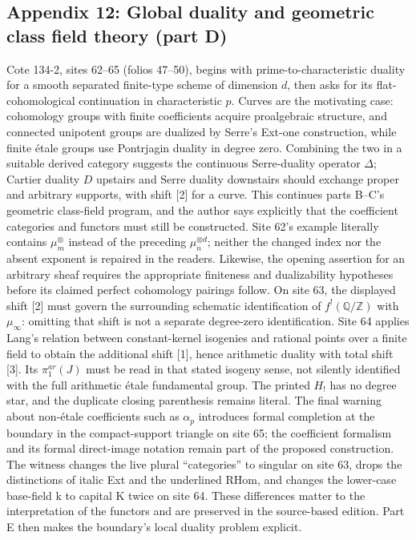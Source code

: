 \subsection*{Appendix 12: Global duality and geometric class field theory (part D)}
Cote 134-2, sites 62--65 (folios 47--50), begins with prime-to-characteristic duality for a smooth separated finite-type scheme of dimension $d$, then asks for its flat-cohomological continuation in characteristic $p$. Curves are the motivating case: cohomology groups with finite coefficients acquire proalgebraic structure, and connected unipotent groups are dualized by Serre's Ext-one construction, while finite étale groups use Pontrjagin duality in degree zero. Combining the two in a suitable derived category suggests the continuous Serre-duality operator $\Delta$; Cartier duality $D$ upstairs and Serre duality downstairs should exchange proper and arbitrary supports, with shift [2] for a curve. This continues parts B--C's geometric class-field program, and the author says explicitly that the coefficient categories and functors must still be constructed. Site 62's example literally contains $\mu_m^{\otimes}$ instead of the preceding $\mu_n^{\otimes d}$; neither the changed index nor the absent exponent is repaired in the readers. Likewise, the opening assertion for an arbitrary sheaf requires the appropriate finiteness and dualizability hypotheses before its claimed perfect cohomology pairings follow. On site 63, the displayed shift [2] must govern the surrounding schematic identification of $f^!(\mathbb Q/\mathbb Z)$ with $\mu_\infty$: omitting that shift is not a separate degree-zero identification. Site 64 applies Lang's relation between constant-kernel isogenies and rational points over a finite field to obtain the additional shift [1], hence arithmetic duality with total shift [3]. Its $\pi_1^{ar}(J)$ must be read in that stated isogeny sense, not silently identified with the full arithmetic étale fundamental group. The printed $H_!$ has no degree star, and the duplicate closing parenthesis remains literal. The final warning about non-étale coefficients such as $\alpha_p$ introduces formal completion at the boundary in the compact-support triangle on site 65; the coefficient formalism and its formal direct-image notation remain part of the proposed construction. The witness changes the live plural ``categories'' to singular on site 63, drops the distinctions of italic Ext and the underlined RHom, and changes the lower-case base-field k to capital K twice on site 64. These differences matter to the interpretation of the functors and are preserved in the source-based edition. Part E then makes the boundary's local duality problem explicit.

